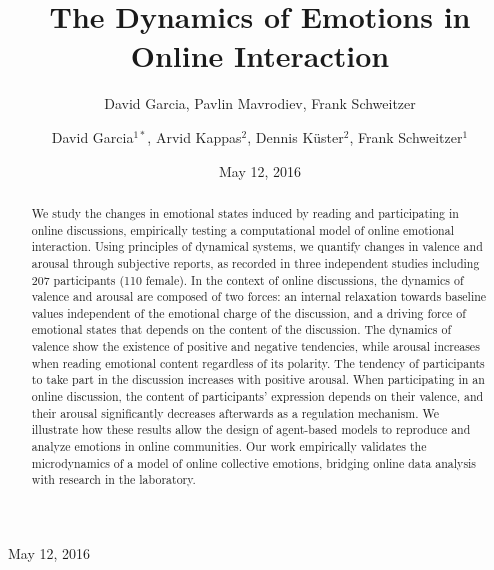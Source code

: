 \documentclass[nologo,url,11pt,a4paper]{ETHpaper}
\begin{document}
\title{The Dynamics of Emotions in Online Interaction}



\author{David Garcia, Pavlin Mavrodiev, Frank  Schweitzer}


\author{David Garcia$^{1*}$, Arvid Kappas$^{2}$, Dennis K\"uster$^{2}$, Frank Schweitzer$^{1}$}

\address{$^{1}$Chair of Systems Design, ETH  Zurich, Weinbergstrasse 56/58, 8092 Zurich,  Switzerland \\
$^{2}$ Jacobs University Bremen,  Campus Ring 1, 28759 Bremen, Germany\\
$^{*}$ dgarcia@ethz.ch }

\date{May 12, 2016}


\maketitle
\centerline{May 12, 2016}

\begin{abstract}
We study the changes in emotional states induced by reading and participating in online discussions, empirically testing a computational model of online emotional interaction. 
Using principles of dynamical systems, we quantify changes in valence and arousal through subjective reports, as recorded in three independent studies including 207 participants (110 female). 
In the context of online discussions, the dynamics of valence and arousal are composed of two forces: an internal relaxation towards baseline values independent of the emotional charge of the discussion,  and  a driving force of emotional states that depends on the content of the discussion. 
The dynamics of valence show the existence of positive and negative tendencies, while arousal increases when reading emotional content regardless of its polarity. 
The tendency of participants to take part in the discussion increases with positive arousal.
When participating in an online discussion, the content of participants' expression depends on their valence,
and their arousal  significantly decreases afterwards as a regulation mechanism. 
We illustrate how these results allow the design of agent-based models  to reproduce and analyze emotions in online communities.
Our work empirically validates the microdynamics of a model of online collective emotions, bridging online data analysis  with  research in the laboratory.
\end{abstract}
\end{document}
